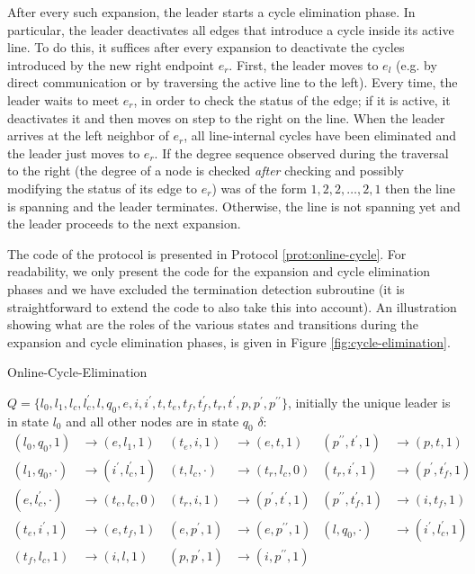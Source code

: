 \documentclass[preprint]{elsarticle}
\newcommand{\ra}{\rightarrow}
\newcommand{\dprime}{{\prime\prime}}
\begin{document}
After every such expansion, the leader starts a cycle elimination phase. In particular, the leader deactivates all edges that introduce a cycle inside its active line. To do this, it suffices after every expansion to deactivate the cycles introduced by the new right endpoint $e_r$. First, the leader moves to $e_l$ (e.g. by direct communication or by traversing the active line to the left). Every time, the leader waits to meet $e_r$, in order to check the status of the edge; if it is active, it deactivates it and then moves on step to the right on the line. When the leader arrives at the left neighbor of $e_r$, all line-internal cycles have been eliminated and the leader just moves to $e_r$. If the degree sequence observed during the traversal to the right (the degree of a node is checked \emph{after} checking and possibly modifying the status of its edge to $e_r$) was of the form $1,2,2,\ldots,2,1$ then the line is spanning and the leader terminates. Otherwise, the line is not spanning yet and the leader proceeds to the next expansion.

The code of the protocol is presented in Protocol \ref{prot:online-cycle}. For readability, we only present the code for the expansion and cycle elimination phases and we have excluded the termination detection subroutine (it is straightforward to extend the code to also take this into account). An illustration showing what are the roles of the various states and transitions during the expansion and cycle elimination phases, is given in Figure \ref{fig:cycle-elimination}.

\renewcommand{\algorithmiccomment}[1]{// #1}
\begin{algorithm}[!h]
  \caption{Online-Cycle-Elimination}\label{prot:online-cycle}
  \begin{algorithmic}
    \medskip
    \State $Q=\{l_0,l_1,l_c,l_c^\prime,l,q_0,e,i,i^\prime,t,t_e,t_f,t_f^\prime,t_r,t^\prime,p,p^\prime,p^{\dprime}\}$, initially the unique leader is in state $l_0$ and all other nodes are in state $q_0$
    \State $\delta$: 
    \begin{align*}
    (l_0,q_0,1) &\ra (e,l_1,1) &
    (t_e,i,1) &\ra (e,t,1)&
    (p^{\dprime},t^\prime,1) &\ra (p,t,1)\\
    (l_1,q_0,\cdot) &\ra (i^\prime,l_c^\prime,1) &
    (t,l_c,\cdot) &\ra (t_r,l_c,0) &
    (t_r,i^\prime,1) &\ra (p^\prime,t_f^\prime,1)\\
    (e,l_c^\prime,\cdot) &\ra (t_e,l_c,0) &
    (t_r,i,1) &\ra (p^\prime,t^\prime,1) &
    (p^{\dprime},t_f^\prime,1) &\ra (i,t_f,1)\\
    (t_e,i^\prime,1) &\ra (e,t_f,1) &
    (e,p^\prime,1) &\ra (e,p^{\dprime},1) &
    (l,q_0,\cdot) &\ra (i^\prime,l_c^\prime,1)\\
    (t_f,l_c,1) &\ra (i,l,1) &
    (p,p^\prime,1) &\ra (i,p^{\dprime},1)
    \end{align*}
    \State {}
    \State {}    
  \end{algorithmic}
\end{algorithm}
\end{document}
